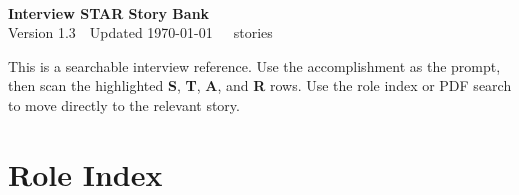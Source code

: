 \documentclass[10pt,a4paper]{article}
\newcommand{\documentversion}{1.3}
\newcommand{\lastupdated}{\today}
\begin{document}
{\LARGE\bfseries\textcolor{accent}{\contactname}}\\[2pt]
{\Large\bfseries Interview STAR Story Bank}\\[5pt]
{\small Version \documentversion\ \textbar\ Updated \lastupdated\ \textbar\ \storycount\ stories}

\medskip
This is a searchable interview reference. Use the accomplishment as the prompt, then scan
the highlighted \textbf{S}, \textbf{T}, \textbf{A}, and \textbf{R} rows. Use the role index
or PDF search to move directly to the relevant story.

\section*{Role Index}



\end{document}
